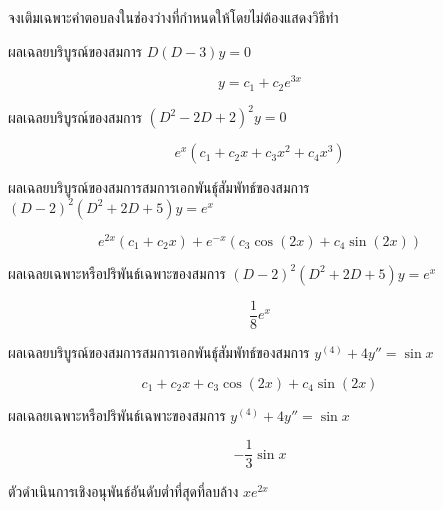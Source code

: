 \documentclass[12pt,final]{novelette} %
\begin{document}
\begin{question}[resume]
    \item {}
    จงเติมเฉพาะคำตอบลงในช่องว่างที่กำหนดให้โดยไม่ต้องแสดงวิธีทำ 
    \begin{question}
        \item
        ผลเฉลยบริบูรณ์ของสมการ $D(D-3)y = 0$ 

        $$ \boxed{y = c_1 + c_2 e^{3x}} $$

        \item
        ผลเฉลยบริบูรณ์ของสมการ $(D^2 - 2D + 2)^2 y = 0$ 

        $$ \boxed{e^x (c_1 + c_2 x + c_3 x^2 + c_4 x^3)} $$

        \pagebreak

        \item
        ผลเฉลยบริบูรณ์ของสมการสมการเอกพันธ์ุสัมพัทธ์ของสมการ $(D-2)^2(D^2+2D+5)y = e^x$ 

        $$ \boxed{e^{2x} (c_1 + c_2 x) + e^{-x}(c_3 \cos(2x) + c_4 \sin(2x))} $$

        \item
        ผลเฉลยเฉพาะหรือปริพันธ์เฉพาะของสมการ $(D-2)^2(D^2+2D+5)y = e^x$ 

        $$ \boxed{\frac18 e^x} $$

        \item
        ผลเฉลยบริบูรณ์ของสมการสมการเอกพันธ์ุสัมพัทธ์ของสมการ $y^{(4)} + 4y'' = \sin x$ 

        $$ \boxed{c_1 + c_2 x + c_3 \cos(2x) + c_4 \sin(2x)} $$

        \item
        ผลเฉลยเฉพาะหรือปริพันธ์เฉพาะของสมการ $y^{(4)} + 4y'' = \sin x$ 

        $$ \boxed{-\frac{1}{3} \sin x} $$

        \item
        ตัวดําเนินการเชิงอนุพันธ์อันดับต่ำที่สุดที่ลบล้าง $xe^{2x}$ 


\end{question}
\end{question}
\end{document}
